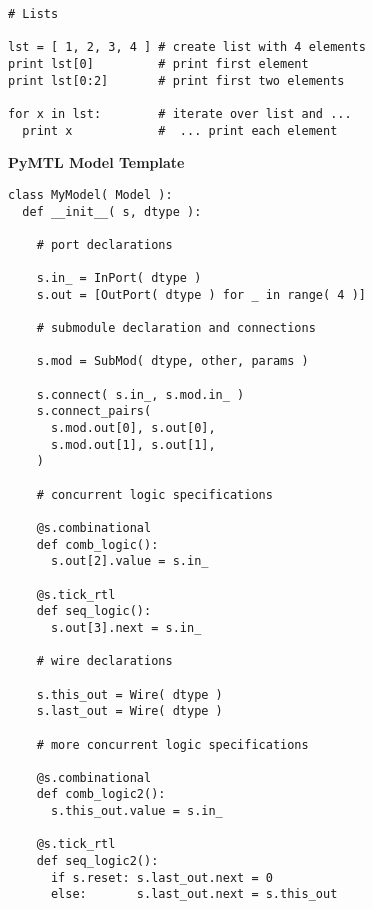 \documentclass{cbxdoc}
\begin{document}
\begin{landscape}
\begin{minipage}[t]{3.25in}
\begin{lstlisting}
# Lists

lst = [ 1, 2, 3, 4 ] # create list with 4 elements
print lst[0]         # print first element
print lst[0:2]       # print first two elements

for x in lst:        # iterate over list and ...
  print x            #  ... print each element
\end{lstlisting}

\end{minipage}%
\hfill%
\begin{minipage}[t]{3.25in}
\vspace{0pt}

\colorbox{gray!30!white}{\parbox{1.025\tw}{\rule[-0.4em]{0pt}{1.4em}\centering\textbf{%
  PyMTL Model Template%
}}}

\smallskip
\begin{lstlisting}
class MyModel( Model ):
  def __init__( s, dtype ):

    # port declarations

    s.in_ = InPort( dtype )
    s.out = [OutPort( dtype ) for _ in range( 4 )]

    # submodule declaration and connections

    s.mod = SubMod( dtype, other, params )

    s.connect( s.in_, s.mod.in_ )
    s.connect_pairs(
      s.mod.out[0], s.out[0],
      s.mod.out[1], s.out[1],
    )

    # concurrent logic specifications

    @s.combinational
    def comb_logic():
      s.out[2].value = s.in_

    @s.tick_rtl
    def seq_logic():
      s.out[3].next = s.in_

    # wire declarations

    s.this_out = Wire( dtype )
    s.last_out = Wire( dtype )

    # more concurrent logic specifications

    @s.combinational
    def comb_logic2():
      s.this_out.value = s.in_

    @s.tick_rtl
    def seq_logic2():
      if s.reset: s.last_out.next = 0
      else:       s.last_out.next = s.this_out
\end{lstlisting}

\end{minipage}%
\hfill%
\begin{minipage}[t]{3.25in}
\vspace{0pt}


\end{minipage}
\end{landscape}
\end{document}
